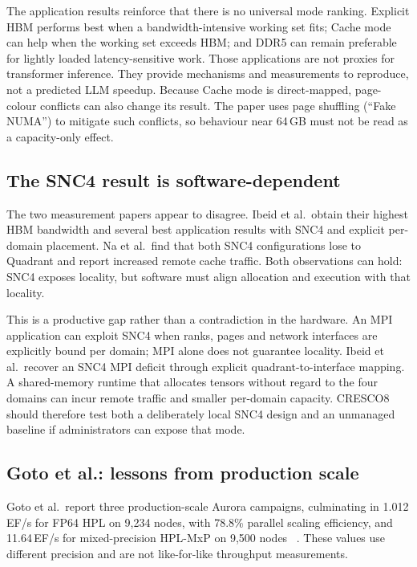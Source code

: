 The application results reinforce that there is no universal mode
ranking.  Explicit HBM performs best when a bandwidth-intensive working
set fits; Cache mode can help when the working set exceeds HBM; and DDR5
can remain preferable for lightly loaded latency-sensitive work.  Those
applications are not proxies for transformer inference.  They provide
mechanisms and measurements to reproduce, not a predicted LLM speedup.
Because Cache mode is direct-mapped, page-colour conflicts can also
change its result.  The paper uses page shuffling (``Fake NUMA'') to
mitigate such conflicts, so behaviour near 64\,GB must not be read as a
capacity-only effect.

\FloatBarrier

\subsection{The SNC4 result is software-dependent}
\label{sec:snc4-synthesis}

The two measurement papers appear to disagree.  Ibeid et al.\ obtain
their highest HBM bandwidth and several best application results with
SNC4 and explicit per-domain placement.  Na et al.\ find that both SNC4
configurations lose to Quadrant and report increased remote cache
traffic.  Both observations can hold: SNC4 exposes locality, but
software must align allocation and execution with that locality.

This is a productive gap rather than a contradiction in the hardware.
An MPI application can exploit SNC4 when ranks, pages and network
interfaces are explicitly bound per domain; MPI alone does not
guarantee locality.  Ibeid et al.\ recover an SNC4 MPI deficit through
explicit quadrant-to-interface mapping.  A shared-memory runtime that
allocates tensors without regard to the four domains can incur remote
traffic and smaller per-domain capacity.  CRESCO8 should therefore test
both a deliberately local SNC4 design and an unmanaged baseline if
administrators can expose that mode.

\subsection{Goto et al.: lessons from production scale}

Goto et al.\ report three production-scale Aurora campaigns, culminating in
1.012\,EF/s for FP64 HPL on 9,234 nodes, with 78.8\% parallel scaling
efficiency, and
11.64\,EF/s for mixed-precision HPL-MxP on 9,500 nodes
~\cite{goto2026aurorahpl}.  These values use different precision and are
not like-for-like throughput measurements.

